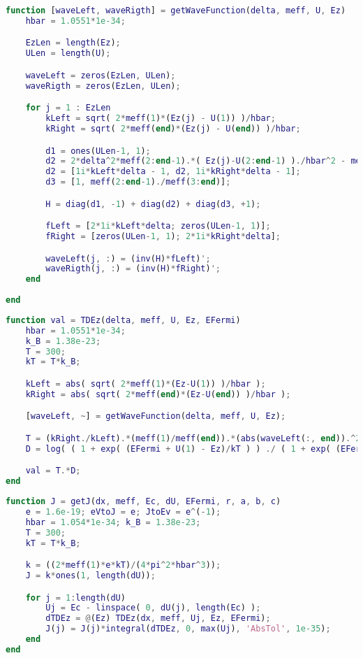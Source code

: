 \begin{lstlisting}[style=realcode,language=Matlab,caption={Алгоритм оценки дипломных работ}]
function [waveLeft, waveRigth] = getWaveFunction(delta, meff, U, Ez)
	hbar = 1.0551*1e-34;

	EzLen = length(Ez);
	ULen = length(U);

	waveLeft = zeros(EzLen, ULen);
	waveRigth = zeros(EzLen, ULen);

	for j = 1 : EzLen
		kLeft = sqrt( 2*meff(1)*(Ez(j) - U(1)) )/hbar;
		kRight = sqrt( 2*meff(end)*(Ez(j) - U(end)) )/hbar;

		d1 = ones(ULen-1, 1);
		d2 = 2*delta^2*meff(2:end-1).*( Ez(j)-U(2:end-1) )./hbar^2 - meff(2:end-1)./meff(3:end) - 1;
		d2 = [1i*kLeft*delta - 1, d2, 1i*kRight*delta - 1];
		d3 = [1, meff(2:end-1)./meff(3:end)];

		H = diag(d1, -1) + diag(d2) + diag(d3, +1);

		fLeft = [2*1i*kLeft*delta; zeros(ULen-1, 1)];
		fRight = [zeros(ULen-1, 1); 2*1i*kRight*delta];

		waveLeft(j, :) = (inv(H)*fLeft)';
		waveRigth(j, :) = (inv(H)*fRight)';
	end
	
end
\end{lstlisting}

\begin{lstlisting}[style=realcode,language=Matlab,caption={Алгоритм оценки дипломных работ}]
function val = TDEz(delta, meff, U, Ez, EFermi)
	hbar = 1.0551*1e-34;
	k_B = 1.38e-23;
	T = 300;
	kT = T*k_B;

	kLeft = abs( sqrt( 2*meff(1)*(Ez-U(1)) )/hbar );
	kRight = abs( sqrt( 2*meff(end)*(Ez-U(end)) )/hbar );

	[waveLeft, ~] = getWaveFunction(delta, meff, U, Ez);

	T = (kRight./kLeft).*(meff(1)/meff(end)).*(abs(waveLeft(:, end)).^2)';
	D = log( ( 1 + exp( (EFermi + U(1) - Ez)/kT ) ) ./ ( 1 + exp( (EFermi + U(end) - Ez)/kT ) ) );

	val = T.*D;
end
\end{lstlisting}

\begin{lstlisting}[style=realcode,language=Matlab,caption={Алгоритм оценки дипломных работ}]
function J = getJ(dx, meff, Ec, dU, EFermi, r, a, b, c)
	e = 1.6e-19; eVtoJ = e; JtoEv = e^(-1); 
	hbar = 1.054*1e-34; k_B = 1.38e-23;
	T = 300;
	kT = T*k_B;

	k = ((2*meff(1)*e*kT)/(4*pi^2*hbar^3));
	J = k*ones(1, length(dU));

	for j = 1:length(dU)
		Uj = Ec - linspace( 0, dU(j), length(Ec) );
		dTDEz = @(Ez) TDEz(dx, meff, Uj, Ez, EFermi);
		J(j) = J(j)*integral(dTDEz, 0, max(Uj), 'AbsTol', 1e-35);
	end
end
\end{lstlisting}